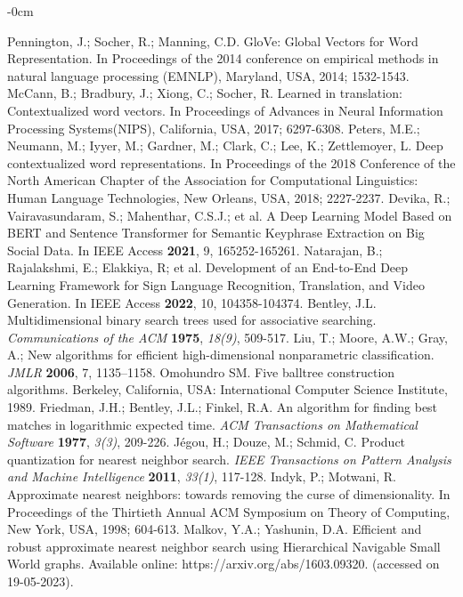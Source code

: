 \documentclass[mathematics,article,submit,moreauthors]{Definitions/mdpi}
\newcommand{\1}[1]{\mathds{1}\left[#1\right]}
\begin{document}
\begin{adjustwidth}{-\extralength}{0cm}
\begin{thebibliography}{999}
	Pennington, J.; Socher, R.; Manning, C.D. GloVe: Global Vectors for Word Representation. In Proceedings of the 2014 conference on empirical methods in natural language processing (EMNLP),  Maryland, USA, 2014; 1532-1543.
	McCann, B.; Bradbury, J.; Xiong, C.; Socher, R. Learned in translation: Contextualized word vectors. In Proceedings of Advances in Neural Information Processing Systems(NIPS), California, USA, 2017; 6297-6308.
	Peters, M.E.; Neumann, M.; Iyyer, M.; Gardner, M.; Clark, C.; Lee, K.; Zettlemoyer, L. Deep contextualized word representations. In Proceedings of the 2018 Conference of the North American Chapter of the Association for Computational Linguistics: Human Language Technologies, New Orleans, USA, 2018; 2227-2237.
	Devika, R.; Vairavasundaram, S.; Mahenthar, C.S.J.; et al. A Deep Learning Model Based on BERT and Sentence Transformer for Semantic Keyphrase Extraction on Big Social Data. In  IEEE Access \textbf{2021}, 9, 165252-165261.
	Natarajan, B.; Rajalakshmi, E.; Elakkiya, R; et al. Development of an End-to-End Deep Learning Framework for Sign Language Recognition, Translation, and Video Generation. In IEEE Access \textbf{2022}, 10, 104358-104374.
	Bentley, J.L. Multidimensional binary search trees used for associative searching. {\em Communications of the ACM} {\bf 1975}, {\em 18(9)}, 509-517.
	Liu, T.; Moore, A.W.; Gray, A.; New algorithms for efficient high-dimensional nonparametric classification. {\em JMLR} {\bf 2006}, 7, 1135–1158.
	Omohundro SM. Five balltree construction algorithms. Berkeley, California, USA: International Computer Science Institute, 1989.
	Friedman, J.H.; Bentley, J.L.; Finkel, R.A. An algorithm for finding best matches in logarithmic expected time. {\em ACM Transactions on Mathematical Software} {\bf 1977}, {\em 3(3)}, 209-226.
	Jégou, H.; Douze, M.; Schmid, C. Product quantization for nearest neighbor search. {\em IEEE Transactions on Pattern Analysis and Machine Intelligence} {\bf 2011}, {\em 33(1)}, 117-128.
	Indyk, P.; Motwani, R. Approximate nearest neighbors: towards removing the curse of dimensionality. In Proceedings of the Thirtieth Annual ACM Symposium on Theory of Computing, New York, USA, 1998; 604-613.
	Malkov, Y.A.; Yashunin, D.A. Efficient and robust approximate nearest neighbor search using Hierarchical Navigable Small World graphs. Available online: https://arxiv.org/abs/1603.09320. (accessed on 19-05-2023).

\end{thebibliography}
\end{adjustwidth}
\end{document}
